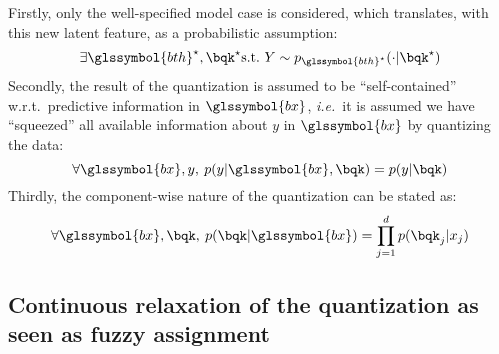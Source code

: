 Firstly, only the well-specified model case is considered, which translates, with this new latent feature, as a probabilistic assumption:
\begin{equation} \label{hyp:true}
\exists \glssymbol{bth}^\star, \bqk^\star \text{s.t.\ } Y \sim p_{\glssymbol{bth}^\star}(\cdot | \bqk^\star)
\end{equation}
Secondly, the result of the quantization is assumed to be ``self-contained'' w.r.t.\ predictive information in $\glssymbol{bx}$, \textit{i.e.}\ it is assumed we have ``squeezed'' all available information about $y$ in $\glssymbol{bx}$ by quantizing the data:
\begin{equation} \label{hyp:squeeze}
\forall \glssymbol{bx},y,\: p(y|\glssymbol{bx},\bqk) = p(y|\bqk)
\end{equation}
Thirdly, the component-wise nature of the quantization can be stated as:
\begin{equation} \label{hyp:component}
\forall \glssymbol{bx},\bqk,\: p(\bqk|\glssymbol{bx}) = \prod_{j=1}^d p(\bqk_j | x_j)
\end{equation}



\subsection{Continuous relaxation of the quantization as seen as fuzzy assignment} \label{subsec:fuzzy}

